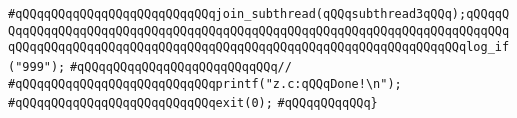 \verb|#qQQqqQQqqQQqqQQqqQQqqQQqqQQqjoin_subthread(qQQqsubthread3qQQq);qQQqqQQqqQQqqQQqqQQqqQQqqQQqqQQqqQQqqQQqqQQqqQQqqQQqqQQqqQQqqQQqqQQqqQQqqQQqqQQqqQQqqQQqqQQqqQQqqQQqqQQqqQQqqQQqqQQqqQQqqQQqqQQqqQQqqQQqqQQqlog_if("999");|\newline
\verb|#qQQqqQQqqQQqqQQqqQQqqQQqqQQq//|\newline
\verb|#qQQqqQQqqQQqqQQqqQQqqQQqqQQqprintf("z.c:qQQqDone!\n");|\newline
\verb|#qQQqqQQqqQQqqQQqqQQqqQQqqQQqexit(0);|\newline
\verb|#qQQqqQQqqQQq}|\newline

